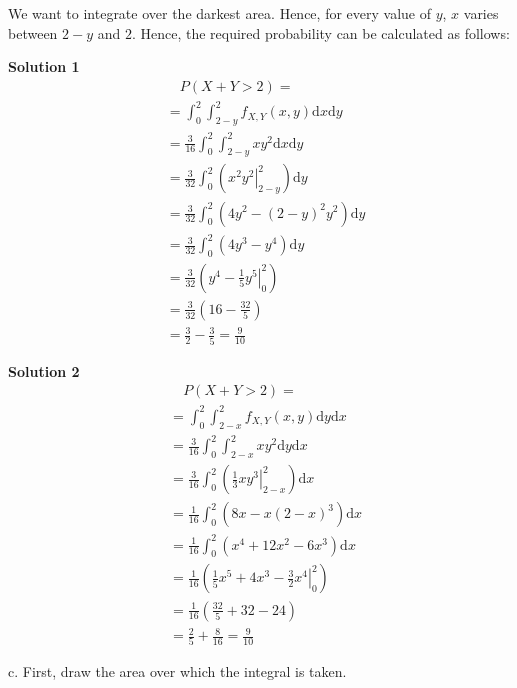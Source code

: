 \begin{exercise}
\begin{solution}
            We want to integrate over the darkest area. Hence, for every value of $y$, $x$ varies between $2-y$ and $2$. Hence, the required probability can be calculated as follows:\\
            \begin{minipage}[t]{0.45\textwidth}
                \textbf{Solution 1}
                \begin{align*}
                    &\quad P(X+Y>2)=\\
                    &= \int_{0}^{2}\int_{2-y}^{2}f_{X,Y}(x,y)\text{d}x\text{d}y\\
                    &= \frac{3}{16}\int_{0}^{2}\int_{2-y}^{2}xy^2\text{d}x\text{d}y\\
                    &= \frac{3}{32}\int_{0}^{2}\left(\left.x^2y^2\right|_{2-y}^2\right)\text{d}y\\
                    &= \frac{3}{32}\int_{0}^{2}(4y^2-(2-y)^2y^2)\text{d}y\\
                    &= \frac{3}{32}\int_{0}^{2}(4y^3-y^4)\text{d}y\\
                    &= \frac{3}{32}\left(\left.y^4-\frac{1}{5}y^5\right|_{0}^2\right)\\
                    &= \frac{3}{32}\left(16-\frac{32}{5}\right)\\
                    &= \frac{3}{2}-\frac{3}{5} = \frac{9}{10} %
                \end{align*}
            \end{minipage}
            \begin{minipage}[t]{0.45\textwidth}
                \textbf{Solution 2}
                \begin{align*}
                    &\quad P(X+Y>2)=\\
                    &= \int_{0}^{2}\int_{2-x}^{2}f_{X,Y}(x,y)\text{d}y\text{d}x\\
                    &= \frac{3}{16}\int_{0}^{2}\int_{2-x}^{2}xy^2\text{d}y\text{d}x\\
                    &= \frac{3}{16}\int_{0}^{2}\left(\left.\frac{1}{3}xy^3\right|_{2-x}^2\right)\text{d}x\\
                    &= \frac{1}{16}\int_{0}^{2}(8x-x(2-x)^3)\text{d}x\\
                    &= \frac{1}{16}\int_{0}^{2}(x^4+12x^2-6x^3)\text{d}x\\
                    &= \frac{1}{16}\left(\left.\frac{1}{5}x^5+4x^3-\frac{3}{2}x^4\right|_{0}^2\right)\\
                    &= \frac{1}{16}\left(\frac{32}{5}+32-24\right)\\
                    &= \frac{2}{5}+\frac{8}{16} = \frac{9}{10} %
                \end{align*}
            \end{minipage}
c. First, draw the area over which the integral is taken. %
            \begin{center}
                \begin{tikzpicture}[scale = 3]


\end{tikzpicture}
\end{center}
\end{solution}
\end{exercise}
